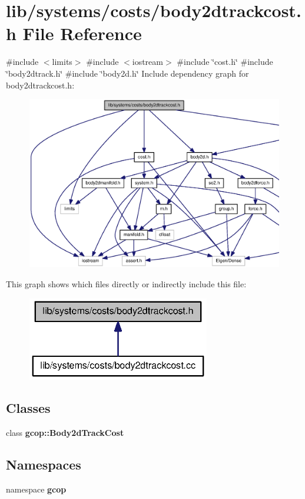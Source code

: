 \section{lib/systems/costs/body2dtrackcost.h \-File \-Reference}
\label{body2dtrackcost_8h}
{\ttfamily \#include $<$limits$>$}\*
{\ttfamily \#include $<$iostream$>$}\*
{\ttfamily \#include \char`\"{}cost.\-h\char`\"{}}\*
{\ttfamily \#include \char`\"{}body2dtrack.\-h\char`\"{}}\*
{\ttfamily \#include \char`\"{}body2d.\-h\char`\"{}}\*
\-Include dependency graph for body2dtrackcost.\-h\-:
\nopagebreak
\begin{figure}[H]
\begin{center}
\leavevmode
\includegraphics[width=350pt]{body2dtrackcost_8h__incl}
\end{center}
\end{figure}
\-This graph shows which files directly or indirectly include this file\-:
\nopagebreak
\begin{figure}[H]
\begin{center}
\leavevmode
\includegraphics[width=226pt]{body2dtrackcost_8h__dep__incl}
\end{center}
\end{figure}
\subsection*{\-Classes}
\begin{DoxyCompactItemize}
\item 
class {\bf gcop\-::\-Body2d\-Track\-Cost}
\end{DoxyCompactItemize}
\subsection*{\-Namespaces}
\begin{DoxyCompactItemize}
\item 
namespace {\bf gcop}
\end{DoxyCompactItemize}
